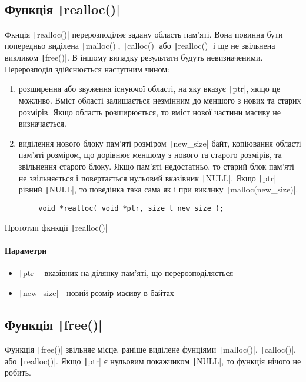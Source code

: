 \subsection[Функція \code{realloc()}]{Функція \texttt|realloc()|}
Фкнція \texttt|realloc()| перерозподіляє задану область пам'яті. Вона повинна бути попередньо виділена \texttt|malloc()|, \texttt|calloc()| або \texttt|realloc()| і ще не звільнена викликом \texttt|free()|. В іншому випадку результати будуть невизначеними.
Перерозподіл здійснюється наступним чином:
\begin{enumerate}
	\item розширення або звуження існуючої області, на яку вказує \texttt|ptr|, якщо це можливо. Вміст області залишається незмінним до меншого з нових та старих розмірів. Якщо область розширюється, то вміст нової частини масиву не визначається.
	\item виділення нового блоку пам'яті розміром \texttt|new_size| байт, копіювання області пам'яті розміром, що дорівнює меншому з нового та старого розмірів, та звільнення старого блоку.
	Якщо пам'яті недостатньо, то старий блок пам'яті не звільняється і повертається нульовий вказівник \texttt|NULL|.
	Якщо \texttt|ptr| рівний \texttt|NULL|, то поведінка така сама як і при виклику \texttt|malloc(new_size)|.
\end{enumerate}
\begin{listing}[H]
	\begin{verbatim}
		void *realloc( void *ptr, size_t new_size );
	\end{verbatim}
	\caption[Прототип ]{Прототип фкнкції \texttt|realloc()|}
	\label{lst:f:realloc}
\end{listing}
\paragraph{Параметри}
\begin{itemize}
	\item \texttt|ptr| - вказівник на ділянку пам'яті, що перерозподіляється
	\item \texttt|new_size| - новий розмір масиву в байтах
\end{itemize}

\subsection[Функція \code{free()}]{Функція \texttt|free()|}
Функція \texttt|free()| звільняє місце, раніше виділене фунціями \texttt|malloc()|, \texttt|calloc()|, або \texttt|realloc()|.
Якщо \texttt|ptr| є нульовим покажчиком \texttt|NULL|, то функція нічого не робить.
